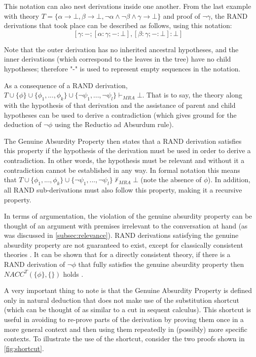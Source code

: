 \documentclass[11pt,twoside,a4paper]{report}
\begin{document}
This notation can also nest derivations inside one another. From the last example with theory $T = \{\alpha\rightarrow\bot, \beta\rightarrow\bot, \neg\alpha\wedge\neg\beta\wedge\gamma\rightarrow\bot\}$ and proof of $\neg\gamma$, the RAND derivations that took place can be described as follows, using this notation:
\[[\gamma:-;[\alpha:\gamma;-:\bot],[\beta:\gamma;-:\bot]:\bot]\]

Note that the outer derivation has no inherited ancestral hypotheses, and the inner derivations (which correspond to the leaves in the tree) have no child hypotheses; therefore "-" is used to represent empty sequences in the notation.

As a consequence of a RAND derivation, $T\cup\{\phi\}\cup\{\phi_1, ..., \phi_k\}\cup\{\neg\psi_1, ..., \neg\psi_l\}\vdash_{MRA}\bot$. That is to say, the theory along with the hypothesis of that derivation and the assistance of parent and child hypotheses can be used to derive a contradiction (which gives ground for the deduction of $\neg\phi$ using the Reductio ad Absurdum rule). 

The Genuine Absurdity Property then states that a RAND derivation satisfies this property if the hypothesis of the derivation must be used in order to derive a contradiction. In other words, the hypothesis must be relevant and without it a contradiction cannot be established in any way. In formal notation this means that $T\cup\{\phi_1, ..., \phi_k\}\cup\{\neg\psi_1, ..., \neg\psi_l\}\nvdash_{MRA}\bot$ (note the absence of $\phi$). In addition, all RAND sub-derivations must also follow this property, making it a recursive property.

In terms of argumentation, the violation of the genuine absurdity property can be thought of an argument with premises irrelevant to the conversation at hand (as was discussed in \autoref{subsec:relevance}). RAND derivations satisfying the genuine absurdity property are not guaranteed to exist, except for classically consistent theories \citep*[p. 9]{alpaper}. It can be shown that for a directly consistent theory, if there is a RAND derivation of $\neg\phi$ that fully satisfies the genuine absurdity property then $NACC^T(\{\phi\},\{\})$ holds \citep*[p. 19]{alpaper}.

A very important thing to note is that the Genuine Absurdity Property is defined only in natural deduction that does not make use of the substitution shortcut (which can be thought of as similar to a cut in sequent calculus). This shortcut is useful in avoiding to re-prove parts of the derivation by proving them once in a more general context and then using them repeatedly in (possibly) more specific contexts. To illustrate the use of the shortcut, consider the two proofs shown in \autoref{fig:shortcut}.
\end{document}
